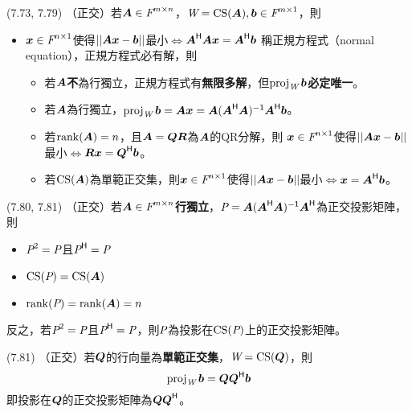 \item \begin{theorem}{(7.73, 7.79)} （正交）若$\mat{A} \in \F^{m \times n}$，$\spc{W} = \cs(\mat{A}), \vec{b} \in \F^{m \times 1}$，則
	\begin{itemize}
		\item $\vec{x} \in \F^{n \times 1}$使得$||\mat{A}\vec{x} - \vec{b}||$最小$\iff$$\mat{A}\herm\mat{A}\vec{x} = \mat{A}\herm\vec{b}$
		稱正規方程式（normal equation），正規方程式必有解，則
		\begin{itemize}
			\item 若$\mat{A}$\textbf{不}為行獨立，正規方程式有\textbf{無限多解}，但\textbf{$\proj{\spc{W}}{b}$必定唯一}。
			\item 若$\mat{A}$為行獨立，$\proj{\spc{W}}{b} = \mat{A}\vec{x} = \mat{A}(\mat{A}\herm\mat{A})\inv\mat{A}\herm\vec{b}$。
			\item 若$\rnk(\mat{A}) = n$，且$\mat{A} = \mat{QR}$為$\mat{A}$的QR分解，則
			$\vec{x} \in \F^{n \times 1}$使得$||\mat{A}\vec{x} - \vec{b}||$最小$\iff$$\mat{R}\vec{x} = \mat{Q}\herm \vec{b}$。
			\item 若$\cs(\mat{A})$為單範正交集，則$\vec{x} \in \F^{n \times 1}$使得$||\mat{A}\vec{x} - \vec{b}||$最小$\iff$$\vec{x} = \mat{A}\herm\vec{b}$。
		\end{itemize}
	\end{itemize}
\end{theorem}

\item \begin{theorem}{(7.80, 7.81)} （正交）若$\mat{A} \in \F^{m \times n}$\textbf{行獨立}，$\P = \mat{A}(\mat{A}\herm\mat{A})\inv\mat{A}\herm$為正交投影矩陣，則
	\begin{itemize}
		\item $\P^2 = \P$且$\P\herm = \P$
		\item $\cs(\P) = \cs(\mat{A})$
		\item $\rnk(\P) = \rnk(\mat{A}) = n$
	\end{itemize}
	\item 反之，若$\P^2 = \P$且$\P\herm = \P$，則$\P$為投影在$\cs(\P)$上的正交投影矩陣。
\end{theorem}

\item \begin{theorem}{(7.81)} （正交）若$\mat{Q}$的行向量為\textbf{單範正交集}，$\spc{W} = \cs(\mat{Q})$，則
	\begin{equation}
		\proj{\spc{W}}{b} = \mat{Q}\mat{Q}\herm\vec{b}
	\end{equation}
	即投影在$\mat{Q}$的正交投影矩陣為$\mat{Q}\mat{Q}\herm$。
\end{theorem}

